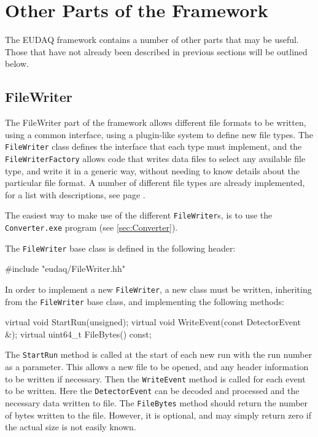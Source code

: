 \section{Other Parts of the Framework}
The EUDAQ framework contains a number of other parts that may be useful.
Those that have not already been described in previous sections will be outlined below.

\subsection{FileWriter}
The FileWriter part of the framework allows different file formats to be written,
using a common interface, using a plugin-like system to define new file types.
The \texttt{FileWriter} class defines the interface that each type must implement,
and the \texttt{FileWriterFactory} allows code that writes data files to select any
available file type, and write it in a generic way,
without needing to know details about the particular file format.
A number of different file types are already implemented,
for a list with descriptions, see page \pageref{lst:FileTypes}.

The easiest way to make use of the different \texttt{FileWriter}s,
is to use the \texttt{Converter.exe} program (see \autoref{sec:Converter}).

The \texttt{FileWriter} base class is defined in the following header:
\begin{listing}
#include "eudaq/FileWriter.hh"
\end{listing}

In order to implement a new \texttt{FileWriter}, a new class must be written,
inheriting from the \texttt{FileWriter} base class, and implementing the following methods:
\begin{listing}
virtual void StartRun(unsigned);
virtual void WriteEvent(const DetectorEvent &);
virtual uint64_t FileBytes() const;
\end{listing}

The \texttt{StartRun} method is called at the start of each new run
with the run number as a parameter.
This allows a new file to be opened, and any header information to be written if necessary.
Then the \texttt{WriteEvent} method is called for each event to be written.
Here the \texttt{DetectorEvent} can be decoded and processed
and the necessary data written to file.
The \texttt{FileBytes} method should return the number of bytes written to the file.
However, it is optional, and may simply return zero if the actual size is not easily known.


